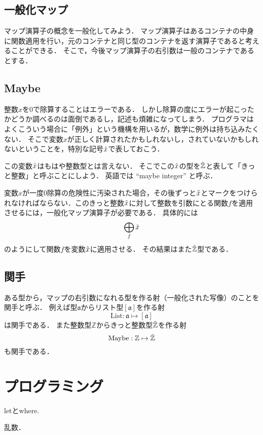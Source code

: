 \documentclass[twocolumn]{jsbook}
\newcommand{\integertype}{\mathbb{Z}}
\newcommand{\listfunctor}{\text{List}}
\newcommand{\mapfunc}{\bigoplus}
\newcommand{\mapfunctext}{\mathop{\mathrm{map}}}
\newcommand{\maybe}[1]{\Tilde{#1}}
\newcommand{\maybefunctor}{\text{Maybe}}
\newcommand{\typename}[1]{\mathfrak{#1}}
\begin{document}
\section{一般化マップ}

マップ演算子の概念を一般化してみよう．
マップ演算子はあるコンテナの中身に関数適用を行い，元のコンテナと同じ型のコンテナを返す演算子であると考えることができる．
そこで，今後マップ演算子の右引数は一般のコンテナであるとする．


\section{Maybe}

整数$x$を$0$で除算することはエラーである．
しかし除算の度にエラーが起こったかどうか調べるのは面倒であるし，記述も煩雑になってしまう．
プログラマはよくこういう場合に「例外」という機構を用いるが，数学に例外は持ち込みたくない．
そこで変数$x$が正しく計算されたかもしれないし，されていないかもしれないということを，特別な記号$\maybe{x}$で表しておこう．

この変数$\maybe{x}$はもはや整数型とは言えない．
そこでこの$\maybe{x}$の型を$\maybe{\integertype}$と表して「きっと整数」と呼ぶことにしよう．
英語では ``maybe integer'' と呼ぶ．

変数$x$が一度$0$除算の危険性に汚染された場合，その後ずっと$\maybe{x}$とマークをつけられなければならない．このきっと整数$\maybe{x}$に対して整数を引数にとる関数$f$を適用させるには，一般化マップ演算子が必要である．
具体的には$$\mapfunc_f\maybe{x}$$のようにして関数$f$を変数$\maybe{x}$に適用させる．
その結果はまた$\maybe{\integertype}$型である．

\section{関手}

ある型から，マップの右引数になれる型を作る射（一般化された写像）のことを関手と呼ぶ．
例えば型$\typename{a}$からリスト型$[\typename{a}]$を作る射$$\listfunctor:\typename{a}\mapsto[\typename{a}]$$は関手である．
また整数型$\integertype$からきっと整数型$\maybe{\integertype}$を作る射$$\maybefunctor:\integertype\mapsto\maybe{\integertype}$$も関手である．



\chapter{プログラミング}

letとwhere.

乱数．
\end{document}
